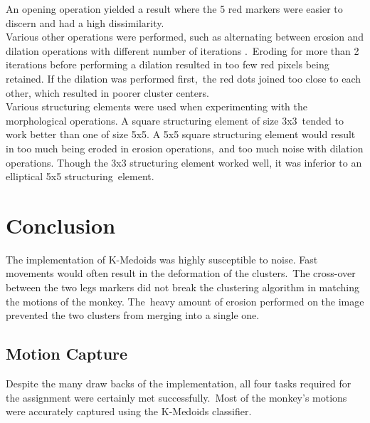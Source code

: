 \documentclass[12pt,a4paper]{article}
\begin{document}
      An opening operation yielded a result where the 5 red markers were easier to discern and had a high dissimilarity.\\

      Various other operations were performed, such as alternating between erosion and dilation operations with different number of iterations .\
      Eroding for more than 2 iterations before performing a dilation resulted in too few red pixels being retained. If the dilation was performed first,\
      the red dots joined too close to each other, which resulted in poorer cluster centers.\\

      Various structuring elements were used when experimenting with the morphological operations. A square structuring element of size 3x3\
      tended to work better than one of size 5x5. A 5x5 square structuring element would result in too much being eroded in erosion operations,\
      and too much noise with dilation operations. Though the 3x3 structuring element worked well, it was inferior to an elliptical 5x5 structuring\
      element.

    \section{Conclusion}

    The implementation of K-Medoids was highly susceptible to noise. Fast movements would often result in the deformation of the clusters.\
    The cross-over between the two legs markers did not break the clustering algorithm in matching the motions of the monkey. The\
    heavy amount of erosion performed on the image prevented the two clusters from merging into a single one.

      \subsection{Motion Capture}

      Despite the many draw backs of the implementation, all four tasks required for the assignment were certainly met successfully.\
      Most of the monkey's motions were accurately captured using the K-Medoids classifier.
\end{document}
